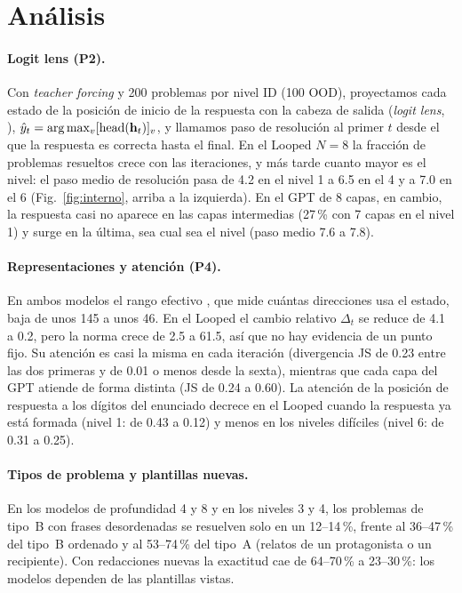 \section{Análisis}
\label{sec:analisis}

\paragraph{Logit lens (P2).}
Con \emph{teacher forcing} y 200 problemas por nivel ID (100 OOD), proyectamos cada estado de la posición de inicio de la
respuesta con la cabeza de salida (\emph{logit lens}, \citealp{nostalgebraist2020logitlens}),
$\hat y_t = \arg\max_v[\mathrm{head}(\mathbf{h}_{t})]_v$, y llamamos paso de resolución
al primer $t$ desde el que la respuesta es correcta hasta el final. En el Looped
$N{=}8$ la fracción de problemas resueltos crece con las iteraciones, y más tarde cuanto mayor es el nivel: el paso medio de resolución pasa de 4.2 en el nivel 1 a 6.5 en el 4 y a
7.0 en el 6 (Fig.~\ref{fig:interno}, arriba a la izquierda). En el GPT de 8 capas,
en cambio, la respuesta casi no aparece en las capas intermedias (27\,\% con 7
capas en el nivel 1) y surge en la última, sea cual sea el nivel (paso medio 7.6
a 7.8).

\paragraph{Representaciones y atención (P4).}
En ambos modelos el rango efectivo \citep{roy2007effective}, que mide cuántas direcciones usa el estado, baja de unos 145 a unos 46. En el Looped el
cambio relativo $\Delta_t$ se reduce de 4.1 a 0.2, pero la norma crece de 2.5 a
61.5, así que no hay evidencia de un punto fijo. Su atención es casi la misma en
cada iteración (divergencia JS de 0.23 entre las dos primeras y de 0.01 o menos
desde la sexta), mientras que cada
capa del GPT atiende de forma distinta (JS de 0.24 a 0.60). La atención de la posición de respuesta
a los dígitos del enunciado decrece en el Looped cuando la respuesta ya está
formada (nivel 1: de 0.43 a 0.12) y menos en los niveles difíciles (nivel 6: de
0.31 a 0.25).

\paragraph{Tipos de problema y plantillas nuevas.}
En los modelos de profundidad 4 y 8 y en los niveles 3 y 4, los problemas de
tipo~B con frases desordenadas se resuelven
solo en un 12--14\,\%, frente al 36--47\,\% del tipo~B ordenado y al 53--74\,\%
del tipo~A (relatos de un protagonista o un recipiente). Con redacciones nuevas la exactitud
cae de 64--70\,\% a 23--30\,\%:
los modelos dependen de las plantillas vistas.
